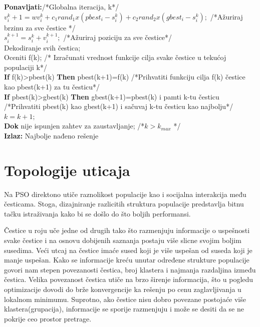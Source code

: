 \documentclass[a4paper]{article}
\begin{document}
\textbf{Ponavljati:}/*Globalna iteracija, k*/ \\
\hspace*{5mm}$v_{i}^k+1 = wv_{i}^k + c_{1}rand_{1} x (pbest_{i} - s_{i}^k) + c_{2}rand_{2} x (gbest_{i} - s_{i}^k);$ /*Ažuriraj brzinu za sve čestice */ \\
\hspace*{5mm}$s_{i}^{k+1} = s_{i}^k + v_{i}^{k+1};$ /*Ažuriraj poziciju za sve čestice*/ \\
\hspace*{5mm}Dekodiranje svih čestica; \\
\hspace*{5mm}Oceniti f(k); /* Izračunati vrednost funkcije cilja svake čestice u tekućoj populaciji k*/ \\
\hspace*{5mm}\textbf{If} f(k)>pbest(k) \textbf{Then} pbest(k+1)=f(k) /*Prihvatiti funkciju cilja f(k) čestice kao pbest(k+1) za tu česticu*/ \\
\hspace*{5mm}\textbf{If} pbest(k)>gbest(k) \textbf{Then} gbest(k+1)=pbest(k) i pamti k-tu česticu  /*Prihvatiti pbest(k) kao gbest(k+1) i sačuvaj k-tu česticu kao najbolju*/ \\
\hspace*{5mm}$k = k+1;$ \\
\textbf{Dok} nije ispunjen zahtev za zaustavljanje; /*$k > k_{max}$  */ \\
\textbf{Izlaz:} Najbolje nađeno rešenje \\

\section{Topologije uticaja}


Na PSO direktono utiče raznolikost populacije kao i socijalna interakcija među česticama. Stoga, dizajniranje razlicitih struktura populacije predstavlja bitnu tačku istraživanja kako bi se došlo do što boljih performansi.

Čestice u roju uče jedne od drugih tako što razmenjuju informacije o uspešnosti svake čestice i na osnovu dobijenih saznanja postaju više slicne svojim boljim susedima. Veći utcaj na čestice imaće sused koji je više uspešan od suseda koji je manje uspešan. Kako se informacije kreću unutar određene strukture populacije govori nam stepen povezanosti čestica, broj klastera i najmanja razdaljina između čestica. Velika povezanost čestica utiče na brzo širenje informacija, što u pogledu optimizacije dovodi do brže konvergencije ka rešenju po cenu zaglavljivanja u lokalnom minimumu. Suprotno, ako čestice nisu dobro povezane postojaće više klastera(grupacija), informacije se sporije razmenjuju i može se desiti da se ne pokrije ceo prostor pretrage.
\end{document}

